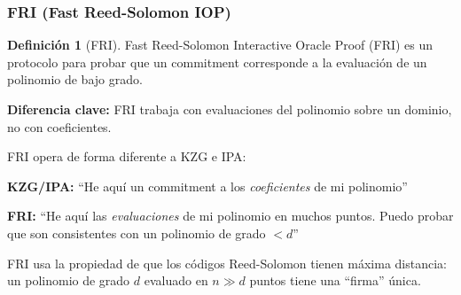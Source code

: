 \documentclass[11pt,a4paper,twoside,openright]{book}
\theoremstyle{definition}
\newtheorem{definition}{Definición}[chapter]
\theoremstyle{plain}
\theoremstyle{remark}
\begin{document}
\subsubsection{FRI (Fast Reed-Solomon IOP)}

\begin{definition}[FRI]
Fast Reed-Solomon Interactive Oracle Proof (FRI) es un protocolo para probar que un commitment corresponde a la evaluación de un polinomio de bajo grado.

\textbf{Diferencia clave:} FRI trabaja con evaluaciones del polinomio sobre un dominio, no con coeficientes.
\end{definition}

\begin{intuicion}
FRI opera de forma diferente a KZG e IPA:

\textbf{KZG/IPA:} ``He aquí un commitment a los \textit{coeficientes} de mi polinomio''

\textbf{FRI:} ``He aquí las \textit{evaluaciones} de mi polinomio en muchos puntos. Puedo probar que son consistentes con un polinomio de grado $< d$''

FRI usa la propiedad de que los códigos Reed-Solomon tienen máxima distancia: un polinomio de grado $d$ evaluado en $n \gg d$ puntos tiene una ``firma'' única.
\end{intuicion}
\end{document}
